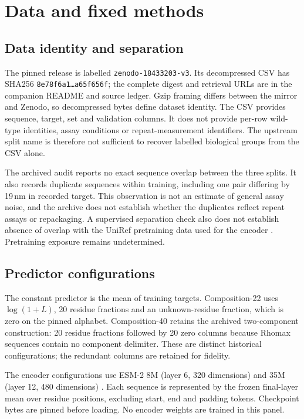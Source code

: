 \documentclass[11pt]{article}
\begin{document}
\section{Data and fixed methods}
\subsection{Data identity and separation}
The pinned release is labelled \texttt{zenodo-18433203-v3}. Its decompressed CSV has
SHA256 \texttt{8e78f6a1\ldots a65f656f}; the complete digest and retrieval URLs are in
the companion README and source ledger. Gzip framing differs between the mirror and
Zenodo, so decompressed bytes define dataset identity. The CSV provides sequence,
target, set and validation columns. It does not provide per-row wild-type identities,
assay conditions or repeat-measurement identifiers. The upstream split name is therefore
not sufficient to recover labelled biological groups from the CSV alone.

The archived audit reports no exact sequence overlap between the three splits. It also
records duplicate sequences within training, including one pair differing by 19\,nm in
recorded target. This observation is not an estimate of general assay noise, and the
archive does not establish whether the duplicates reflect repeat assays or repackaging.
A supervised separation check also does not establish absence of overlap with the
UniRef pretraining data used for the encoder \citep{esm}. Pretraining exposure remains
undetermined.

\subsection{Predictor configurations}
The constant predictor is the mean of training targets. Composition-22 uses
$\log(1+L)$, 20 residue fractions and an unknown-residue fraction, which is zero on
the pinned alphabet. Composition-40 retains the archived two-component construction:
20 residue fractions followed by 20 zero columns because Rhomax sequences contain no
component delimiter. These are distinct historical configurations; the redundant
columns are retained for fidelity.

The encoder configurations use ESM-2 8M (layer 6, 320 dimensions) and 35M (layer 12,
480 dimensions) \citep{lin2023,esm}. Each sequence is represented by the frozen final-layer
mean over residue positions, excluding start, end and padding tokens. Checkpoint bytes
are pinned before loading. No encoder weights are trained in this panel.
\end{document}
